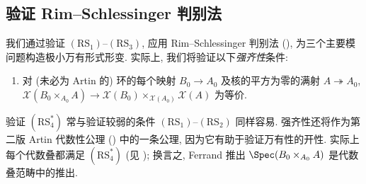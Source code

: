 \subsection{验证 Rim--Schlessinger 判别法}\label{src:C.4.3-subsection}
我们通过验证 $(\mathrm{RS}_1)$--$(\mathrm{RS}_3)$, 应用 Rim--Schlessinger 判别法 (), 为三个主要模问题构造极小万有形式形变. 实际上, 我们将验证以下\textit{强齐性}条件:
\begin{enumerate}[(1)]
\item[$(\mathrm{RS}_4^*)$] 对 (未必为 Artin 的) 环的每个映射 $B_0\to A_0$ 及核的平方为零的满射 $A\twoheadrightarrow A_0$, $\mathcal X(B_0\times_{A_0}A)\to\mathcal X(B_0)\times_{\mathcal X(A_0)}\mathcal X(A)$ 为等价.
\end{enumerate}
验证 $(\mathrm{RS}_4^*)$ 常与验证较弱的条件 $(\mathrm{RS}_1)$--$(\mathrm{RS}_2)$ 同样容易. 强齐性还将作为第二版 Artin 代数性公理 () 中的一条公理, 因为它有助于验证万有性的开性. 实际上每个代数叠都满足 $(\mathrm{RS}_4^*)$ (见 \cite[Tag 07WN]{SP}); 换言之, Ferrand 推出 $\Spec(B_0\times_{A_0}A)$ 是代数叠范畴中的推出.

